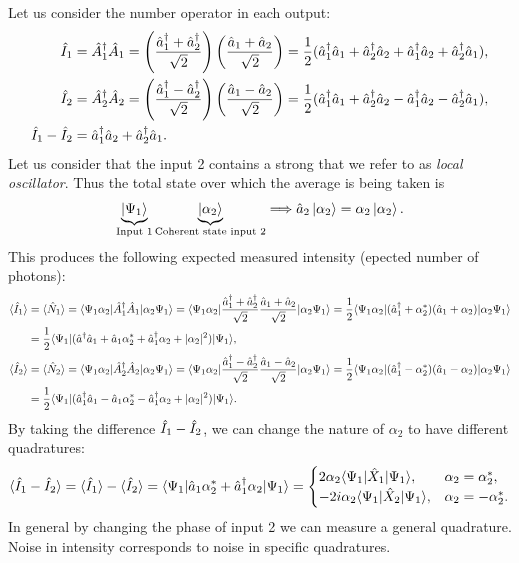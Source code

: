 Let us consider the number operator in each output:
\begin{align*}
    \hat{I}_1&=\hat{A}_1^\dagger\hat{A}_1=\left(\frac{\hat{a}_1^\dagger+\hat{a}_2^\dagger}{\sqrt{2}}\right)\left(\frac{\hat{a}_1+\hat{a}_2}{\sqrt{2}}\right)=\frac{1}{2}(\hat{a}_1^\dagger\hat{a}_1+\hat{a}_2^\dagger\hat{a}_2+\hat{a}_1^\dagger\hat{a}_2+\hat{a}_2^\dagger\hat{a}_1),\\
    \hat{I}_2&=\hat{A}_2^\dagger\hat{A}_2=\left(\frac{\hat{a}_1^\dagger-\hat{a}_2^\dagger}{\sqrt{2}}\right)\left(\frac{\hat{a}_1-\hat{a}_2}{\sqrt{2}}\right)=\frac{1}{2}(\hat{a}_1^\dagger\hat{a}_1+\hat{a}_2^\dagger\hat{a}_2-\hat{a}_1^\dagger\hat{a}_2-\hat{a}_2^\dagger\hat{a}_1),\\
    \hat{I}_1-\hat{I}_2&=\hat{a}_1^\dagger\hat{a}_2+\hat{a}_2^\dagger\hat{a}_1.
\end{align*}
Let us consider that the input 2 contains a strong  that we refer to as \emph{local oscillator}. Thus the total state over 
which the average is being taken is 
\begin{align}
    \underbrace{\left|\Psi_1\right\rangle}_{\text{Input 1}}\underbrace{\left|\alpha_2\right\rangle}_{\text{Coherent state input 2}}\Longrightarrow \hat{a}_2\left|\alpha_2\right\rangle=\alpha_2\left|\alpha_2\right\rangle.
\end{align}
This produces the following expected measured intensity (epected number of photons): 
\begin{align*}
    \langle\hat{I}_1\rangle&=\langle\hat{N}_1\rangle=\langle\Psi_1\alpha_2|\hat{A}^\dagger_{1}\hat{A}_1|\alpha_2\Psi_1\rangle=\langle\Psi_1\alpha_2|\frac{\hat{a}^\dagger_1+\hat{a}^\dagger_2}{\sqrt{2}}\frac{\hat{a}_1+\hat{a}_2}{\sqrt{2}}|\alpha_2\Psi_1\rangle=
    \frac{1}{2}\langle\Psi_1\alpha_2|(\hat{a}^\dagger_1+\alpha_2^*)(\hat{a}_1+\alpha_2)|\alpha_2\Psi_1\rangle\\
    &=\frac{1}{2}\langle\Psi_1|(\hat{a}^\dagger\hat{a}_1+\hat{a}_1\alpha_2^*+\hat{a}^\dagger_1\alpha_2+|\alpha_2|^2)|\Psi_1\rangle,\\
    \langle\hat{I}_2\rangle&=\langle\hat{N}_2\rangle=\langle\Psi_1\alpha_2|\hat{A}^\dagger_2\hat{A}_2|\alpha_2\Psi_1\rangle=\langle\Psi_1\alpha_2|\frac{\hat{a}^\dagger_1-\hat{a}^\dagger_2}{\sqrt{2}}\frac{\hat{a}_1-\hat{a}_2}{\sqrt{2}}|\alpha_2\Psi_1\rangle=
    \frac{1}{2}\langle\Psi_1\alpha_2|(\hat{a}^\dagger_1-\alpha_2^*)(\hat{a}_1-\alpha_2)|\alpha_2\Psi_1\rangle\\
    &=\frac{1}{2}\langle\Psi_1|(\hat{a}_1^\dagger\hat{a}_1-\hat{a}_1\alpha_2^*-\hat{a}^\dagger_1\alpha_2+|\alpha_2|^2)|\Psi_1\rangle.
\end{align*}
By taking the difference $\hat{I}_1-\hat{I}_2$, we can change the nature of $\alpha_2$ to have different quadratures:
\begin{align*}
    \langle\hat{I}_1-\hat{I}_2\rangle=\langle\hat{I}_1\rangle-\langle\hat{I}_2\rangle=\langle\Psi_1|\hat{a}_1\alpha_2^*+\hat{a}_1^\dagger\alpha_2|\Psi_1\rangle=\begin{cases}
        2\alpha_2\langle\Psi_1|\hat{X}_1|\Psi_1\rangle,&\alpha_2=\alpha_2^*,\\
        -2i\alpha_2\langle\Psi_1|\hat{X}_2|\Psi_1\rangle,&\alpha_2=-\alpha_2^*.
    \end{cases}
\end{align*}
In general by changing the phase of input 2 we can measure a general quadrature. Noise in intensity corresponds to noise in specific quadratures.

